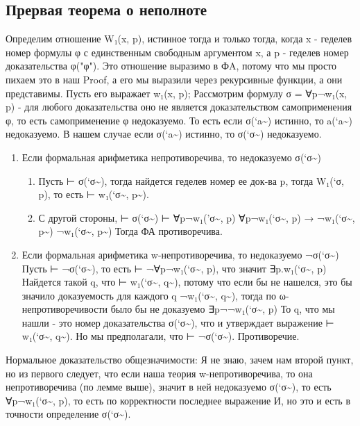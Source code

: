 \documentclass[11pt]{article}
\begin{document}
\subsection{Прервая теорема о неполноте}
\label{sec-13-2}
Определим отношение W₁(x, p), истинное тогда и только тогда,
когда x - геделев номер формулы φ с единственным свободным
аргументом x, а p - геделев номер доказательства φ("φ"). Это
отношение выразимо в ФA, потому что мы просто пихаем это в наш
Proof, а его мы выразили через рекурсивные функции, а они
представимы.
Пусть его выражает w₁(x, p);
Рассмотрим формулу σ = ∀p¬w₁(x, p) - для любого доказательства
оно не является доказательством самоприменения φ, то есть
самоприменение φ недоказуемо.
То есть если σ(`a\textasciitilde{}) истинно, то a(`a\textasciitilde{}) недоказуемо.
В нашем случае если σ(`a\textasciitilde{}) истинно, то σ(`σ\textasciitilde{}) недоказуемо.
\begin{enumerate}
\item Если формальная арифметика непротиворечива, то недоказуемо σ(`σ\textasciitilde{})
\begin{enumerate}
\item Пусть ⊢ σ(`σ\textasciitilde{}), тогда найдется геделев номер ее док-ва p,
тогда W₁(`σ, p), то есть ⊢ w₁(`σ\textasciitilde{}, p\textasciitilde{}).
\item С другой стороны,
⊢ σ(`σ\textasciitilde{})
⊢ ∀p¬w₁('σ\textasciitilde{}, p)
∀p¬w₁(`σ\textasciitilde{}, p) → ¬w₁(`σ\textasciitilde{}, p\textasciitilde{})
¬w₁(`σ\textasciitilde{}, p\textasciitilde{})
Тогда ФА противоречива.
\end{enumerate}
\item Если формальная арифметика w-непротиворечива, то недоказуемо ¬σ(`σ\textasciitilde{})
Пусть ⊢ ¬σ(`σ\textasciitilde{}), то есть ⊢ ¬∀p¬w₁(`σ\textasciitilde{}, p), что значит ∃p.w₁(`σ\textasciitilde{}, p)
Найдется такой q, что ⊢ w₁(`σ\textasciitilde{}, q\textasciitilde{}), потому что если бы не нашелся,
это бы значило доказуемость для каждого q ¬w₁(`σ\textasciitilde{}, q\textasciitilde{}), тогда по
ω-непротиворечивости было бы не доказуемо ∃p¬¬w₁(`σ\textasciitilde{}, p)
То q, что мы нашли - это номер доказательства  σ(`σ\textasciitilde{}), что и
утверждает выражение ⊢ w₁(`σ\textasciitilde{}, q\textasciitilde{}). Но мы предполагали, что ⊢ ¬σ(`σ\textasciitilde{}).
Противоречие.
\end{enumerate}

Нормальное доказательство общезначимости:
Я не знаю, зачем нам второй пункт, но из первого следует, что если
наша теория w-непротиворечива, то она непротиворечива (по лемме выше),
значит в ней недоказуемо σ(`σ\textasciitilde{}), то есть ∀p¬w₁(`σ\textasciitilde{}, p), то есть
по корректности последнее выражение И, но это и есть в точности определение
σ(`σ\textasciitilde{}).
\end{document}
